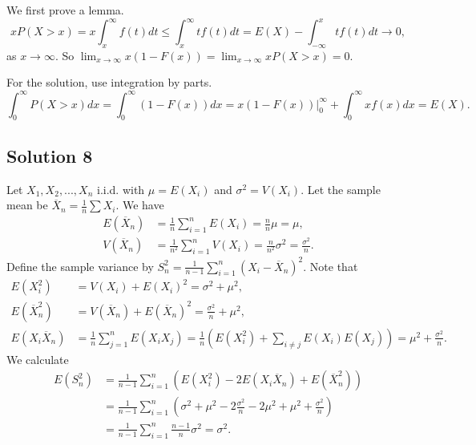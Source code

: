 We first prove a lemma.
\begin{equation*}
    x P(X > x) = x \int_x^{\infty} f(t) dt
        \leq \int_x^{\infty} t f(t) dt
        = E(X) - \int_{-\infty}^{x} t f(t) dt
        \to 0,
\end{equation*}
as $x \to \infty$.
So $\lim_{x \to \infty} x(1 - F(x)) = \lim_{x \to \infty} x P(X > x) = 0$.

For the solution, use integration by parts.
\begin{equation*}
    \int_0^{\infty} P(X > x) dx = \int_0^{\infty} (1 - F(x)) dx
        = x(1 - F(x))|_0^{\infty} + \int_0^{\infty} xf(x) dx
        = E(X).
\end{equation*}


\subsection*{Solution 8}

Let $X_1, X_2, ..., X_n$ i.i.d. with $\mu = E(X_i)$ and $\sigma^2 = V(X_i)$.
Let the sample mean be $\overline{X}_n = \frac{1}{n} \sum X_i$.
We have
\begin{equation*}
    \begin{split}
        E(\overline{X}_n) &= \frac{1}{n} \sum_{i = 1}^n E(X_i)
            = \frac{n}{n} \mu
            = \mu, \\
        V(\overline{X}_n) &= \frac{1}{n^2} \sum_{i = 1}^n V(X_i)
            = \frac{n}{n^2} \sigma^2
            = \frac{\sigma^2}{n}.
    \end{split}
\end{equation*}
Define the sample variance by $S^2_n = \frac{1}{n - 1} \sum_{i = 1}^n (X_i - \overline{X}_n)^2$.
Note that
\begin{equation*}
    \begin{split}
        E(X_i^2) &= V(X_i) + E(X_i)^2 = \sigma^2 + \mu^2, \\
        E(\overline{X}_n^2) &= V(\overline{X}_n) + E(\overline{X}_n)^2 = \frac{\sigma^2}{n} + \mu^2, \\
        E(X_i \overline{X}_n) &= \frac{1}{n} \sum_{j = 1}^n E(X_i X_j)
            = \frac{1}{n} \left(E(X_i^2) + \sum_{i \neq j} E(X_i) E(X_j)\right)
            = \mu^2 + \frac{\sigma^2}{n}.
    \end{split}
\end{equation*}
We calculate
\begin{equation*}
    \begin{split}
        E(S_n^2) &= \frac{1}{n - 1} \sum_{i = 1}^n \left(E(X_i^2) - 2 E(X_i \overline{X}_n) + E(\overline{X}_n^2)\right) \\
            &= \frac{1}{n - 1} \sum_{i = 1}^n \left(\sigma^2 + \mu^2 - 2 \frac{\sigma^2}{n} - 2 \mu^2 + \mu^2 + \frac{\sigma^2}{n}\right) \\
            &= \frac{1}{n - 1} \sum_{i = 1}^n \frac{n - 1}{n} \sigma^2
            = \sigma^2.
    \end{split}
\end{equation*}


